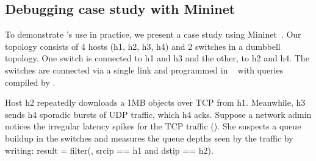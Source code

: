 
\subsection{Debugging case study with Mininet}
\label{s:eval:mininet}
\label{sec:eval:mininet}


To demonstrate \TheSystem's use in practice, we present a case study using
Mininet~\cite{mininet}.
Our topology consists of 4 hosts ({\ct h1, h2, h3, h4}) and 2 switches in a dumbbell topology.
One switch is connected to {\ct h1} and {\ct h3}
and the other, to {\ct h2} and {\ct h4}.
The switches are connected via a single link and
programmed in \pfs~\cite{p4-bmv2} with queries compiled by \TheSystem.

Host {\ct h2} repeatedly downloads a 1MB objects over TCP from {\ct h1}.
Meanwhile, {\ct h3} sends {\ct h4} sporadic bursts of UDP traffic, which
{\ct h4} acks.  Suppose a network admin notices the irregular latency
spikes for the TCP traffic (). She suspects a queue buildup
in the switches and measures the queue depths seen by the traffic by writing:
{\ct result = filter(\pktlog, srcip == h1 and dstip == h2).}


